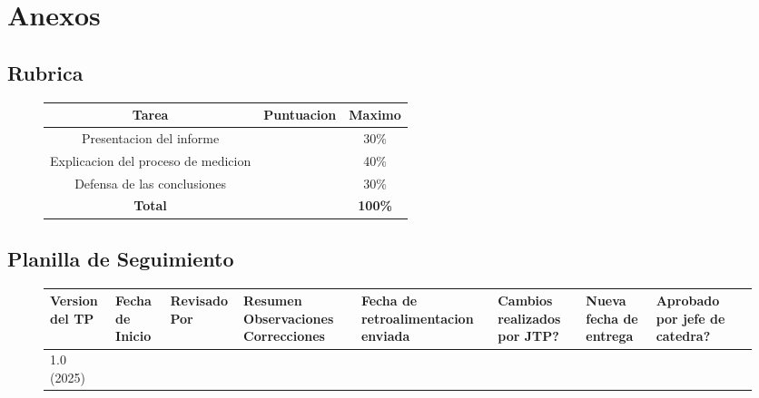 \documentclass[a4paper,12pt, spanish]{report}
\newcommand\myemptypage{
  \newpage
  \null
  \thispagestyle{empty}
  \addtocounter{page}{-1}
  \newpage
}
\begin{document}
      \myemptypage
    \chapter{Anexos}
      \section{Rubrica}
      \begin{figure}[!h]
        \centering
        \begin{tabular}[c]{|c|c|c|}
          \rowcolor{gray!30}
          \hline
          \textbf{Tarea}                      & \textbf{Puntuacion} & \textbf{Maximo}\\
          \hline
          Presentacion del informe            &                     & 30\%\\
          \hline
          Explicacion del proceso de medicion &                     & 40\%\\
          \hline
          Defensa de las conclusiones         &                     & 30\%\\
          \hline
          \textbf{Total}                      &                     & \textbf{100\%}\\
          \hline
        \end{tabular}
      \end{figure}

      \section{Planilla de Seguimiento}
      \begin{figure}[!h]
        \begin{footnotesize}
          \begin{tabular}{|m{1cm}|m{1cm}|m{1.3cm}|m{2cm}|m{1.7cm}|m{1.7cm}|m{1.7cm}|m{1.7cm}|m{1.7cm}|}
            \hline
            Version del TP & Fecha de Inicio & Revisado Por & Resumen Observaciones Correcciones &
            Fecha de retroalimentacion enviada & Cambios realizados por JTP? & Nueva fecha de entrega &
            Aprobado por jefe de catedra?\\
            \hline
            1.0 (2025) & & & & & & &\\
            \hline
          \end{tabular}
        \end{footnotesize}
      \end{figure}
\end{document}
